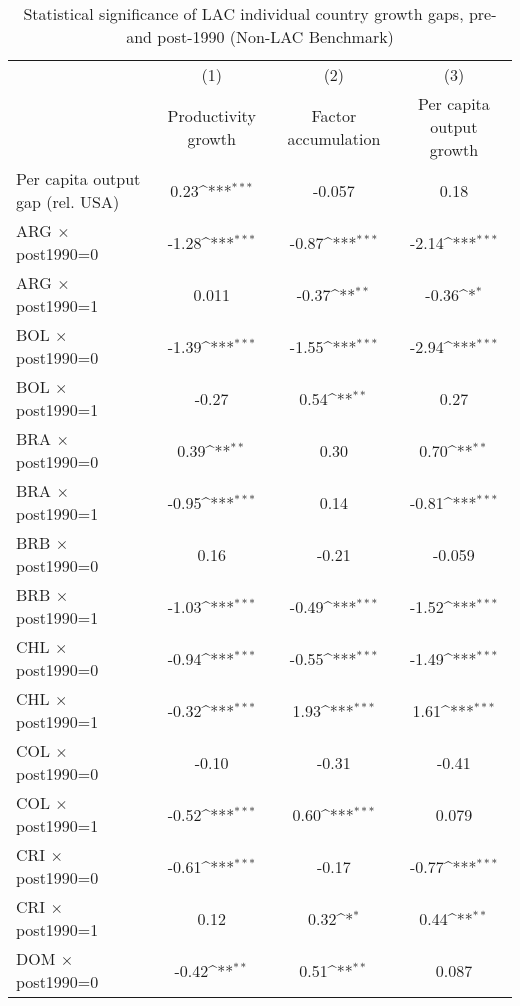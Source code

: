 \begin{table}[htbp]\centering
\def\sym#1{\ifmmode^{#1}\else\(^{#1}\)\fi}
\caption{Statistical significance of LAC individual country growth gaps, pre- and post-1990 (Non-LAC Benchmark)}
\begin{tabular}{l*{3}{c}}
\toprule
                &\multicolumn{1}{c}{(1)}&\multicolumn{1}{c}{(2)}&\multicolumn{1}{c}{(3)}\\
                &\multicolumn{1}{c}{Productivity growth}&\multicolumn{1}{c}{Factor accumulation}&\multicolumn{1}{c}{Per capita output growth}\\
\midrule
Per capita output gap (rel. USA)&     0.23\sym{***}&   -0.057         &     0.18         \\
ARG $\times$ post1990=0&    -1.28\sym{***}&    -0.87\sym{***}&    -2.14\sym{***}\\
ARG $\times$ post1990=1&    0.011         &    -0.37\sym{**} &    -0.36\sym{*}  \\
BOL $\times$ post1990=0&    -1.39\sym{***}&    -1.55\sym{***}&    -2.94\sym{***}\\
BOL $\times$ post1990=1&    -0.27         &     0.54\sym{**} &     0.27         \\
BRA $\times$ post1990=0&     0.39\sym{**} &     0.30         &     0.70\sym{**} \\
BRA $\times$ post1990=1&    -0.95\sym{***}&     0.14         &    -0.81\sym{***}\\
BRB $\times$ post1990=0&     0.16         &    -0.21         &   -0.059         \\
BRB $\times$ post1990=1&    -1.03\sym{***}&    -0.49\sym{***}&    -1.52\sym{***}\\
CHL $\times$ post1990=0&    -0.94\sym{***}&    -0.55\sym{***}&    -1.49\sym{***}\\
CHL $\times$ post1990=1&    -0.32\sym{***}&     1.93\sym{***}&     1.61\sym{***}\\
COL $\times$ post1990=0&    -0.10         &    -0.31         &    -0.41         \\
COL $\times$ post1990=1&    -0.52\sym{***}&     0.60\sym{***}&    0.079         \\
CRI $\times$ post1990=0&    -0.61\sym{***}&    -0.17         &    -0.77\sym{***}\\
CRI $\times$ post1990=1&     0.12         &     0.32\sym{*}  &     0.44\sym{**} \\
DOM $\times$ post1990=0&    -0.42\sym{**} &     0.51\sym{**} &    0.087         \\

\end{tabular}
\end{table}

